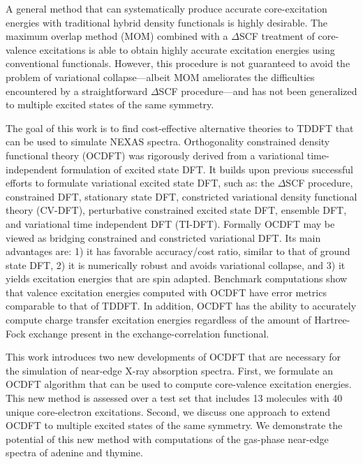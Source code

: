 \documentclass[8.5pt,twoside,twocolumn]{article}
\begin{document}
A general method that can systematically produce accurate core-excitation energies with traditional hybrid density functionals is highly desirable. The maximum overlap method (MOM) \cite{besley_self-consistent-field_2009} combined with a $\Delta$SCF treatment of core-valence excitations is able to obtain highly accurate excitation energies using conventional functionals. However, this procedure is not guaranteed to avoid the problem of variational collapse---albeit MOM ameliorates the difficulties encountered by a straightforward $\Delta$SCF procedure---and has not been generalized to multiple excited states of the same symmetry.

The goal of this work is to find cost-effective alternative theories to TDDFT that can be used to simulate NEXAS spectra.
Orthogonality constrained density functional theory (OCDFT)\cite{evangelista_orthogonality_2013}  was rigorously derived from a variational time-independent formulation of excited state DFT.
It builds upon previous successful efforts to formulate variational excited state DFT, such as: the $\Delta$SCF procedure, \cite{kowalczyk_assessment_2011,ziegler_calculation_1977} constrained DFT,\cite{wu_constrained_2006} stationary state DFT, \cite{gorling_density-functional_1999}  constricted variational density functional theory (CV-DFT), \cite{ziegler_relation_2009,ziegler_application_2011,krykunov_self-consistent_2013,ziegler_implementation_2012}
perturbative constrained excited state DFT,\cite{baruah_dft_2009,olguin_effect_2013,zope_charge_2012} ensemble DFT,\cite{theophilou_energy_1979,fritsche_generalized_1986,gross_rayleigh-ritz_1988,gross_density-functional_1988} and variational time independent DFT (TI-DFT). \cite{levy_variational_1999,nagy_variational_2001}
Formally OCDFT may be viewed as bridging constrained and constricted variational DFT.  Its main advantages are: 1) it has favorable accuracy/cost ratio, similar to that of ground state DFT, 2) it is numerically robust and avoids variational collapse, and 3) it yields excitation energies that are spin adapted.
Benchmark computations\cite{evangelista_orthogonality_2013} show that valence excitation energies computed with OCDFT have error metrics comparable to that of TDDFT.  In addition, OCDFT has the ability to accurately compute charge transfer excitation energies regardless of the amount of Hartree-Fock exchange present in the exchange-correlation functional.

This work introduces two new developments of OCDFT that are necessary for the simulation of near-edge X-ray  absorption spectra.
First, we formulate an OCDFT algorithm that can be used to compute core-valence excitation energies.  This new method is assessed over a test set that includes 13 molecules with 40 unique core-electron excitations.
Second, we discuss one approach to extend OCDFT to multiple excited states of the same symmetry.
We demonstrate the potential of this new method with computations of the gas-phase near-edge spectra of adenine and thymine.
\end{document}
